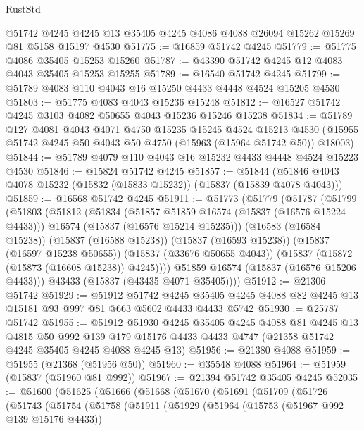 \begin{lexlean}{RustStd}
\begin{coremodule}
{\begin{coremodule}
{{{{{{{{{{{{{{{{{{{{{{{{{{{{{{{{{{{{{{{{{{{{{{{{{{{{{{{{{{{{    @51742
    @4245
    @4245
    @13
    @35405
    @4245
    @4086
    @4088
    @26094
    @15262
    @15269
    @81
    @5158
    @15197
    @4530
@51775 := @16859 @51742 @4245
@51779 := @51775 @4086 @35405 @15253 @15260
@51787 := @43390 @51742 @4245 @12 @4083 @4043 @35405 @15253 @15255
@51789 := @16540 @51742 @4245
@51799 := @51789 @4083 @110 @4043 @16 @15250 @4433 @4448 @4524 @15205 @4530
@51803 := @51775 @4083 @4043 @15236 @15248
@51812 := @16527 @51742 @4245 @3103 @4082 @50655 @4043 @15236 @15246 @15238
@51834 := @51789
    @127
    @4081
    @4043
    @4071
    @4750
    @15235
    @15245
    @4524
    @15213
    @4530
    (@15955 @51742 @4245 @50 @4043 @50 @4750 (@15963 (@15964 @51742 @50)) @18003)
@51844 := @51789 @4079 @110 @4043 @16 @15232 @4433 @4448 @4524 @15223 @4530
@51846 := @15824 @51742 @4245
@51857 := @51844 (@51846 @4043 @4078 @15232 (@15832 (@15833 @15232)) (@15837 (@15839 @4078 @4043)))
@51859 := @16568 @51742 @4245
@51911 := @51773
    (@51779
      (@51787
        (@51799
          (@51803
            (@51812
              (@51834
                (@51857 @51859 @16574 (@15837 (@16576 @15224 @4433)))
                @16574
                (@15837 (@16576 @15214 @15235)))
              (@16583 (@16584 @15238))
              (@15837 (@16588 @15238))
              (@15837 (@16593 @15238))
              (@15837 (@16597 @15238 @50655))
              (@15837 (@33676 @50655 @4043))
              (@15837 (@15872 (@15873 (@16608 @15238)) @4245))))
          @51859
          @16574
          (@15837 (@16576 @15206 @4433)))
        @43433
        (@15837 (@43435 @4071 @35405))))
@51912 := @21306 @51742
@51929 := @51912
    @51742
    @4245
    @35405
    @4245
    @4088
    @82
    @4245
    @13
    @15181
    @93
    @997
    @81
    @663
    @5602
    @4433
    @4433
    @5742
@51930 := @25787 @51742
@51955 := @51912
    @51930
    @4245
    @35405
    @4245
    @4088
    @81
    @4245
    @13
    @4815
    @50
    @992
    @139
    @179
    @15176
    @4433
    @4433
    @4747
    (@21358 @51742 @4245 @35405 @4245 @4088 @4245 @13)
@51956 := @21380 @4088
@51959 := @51955 (@21368 (@51956 @50))
@51960 := @35548 @4088
@51964 := @51959 (@15837 (@51960 @81 @992))
@51967 := @21394 @51742 @35405 @4245
@52035 := @51600
    (@51625
      (@51666
        (@51668
          (@51670
            (@51691
              (@51709
                (@51726
                  (@51743
                    (@51754
                      (@51758
                        (@51911
                          (@51929
                            (@51964
                              (@15753 (@51967 @992 @139 @15176 @4433))
}}}}}}}}}}}}}}}}}}}}}}}}}}}}}}}}}}}}}}}}}}}}}}}}}}}}}}}}}}}}
\end{coremodule}}
\end{coremodule}
\end{lexlean}
